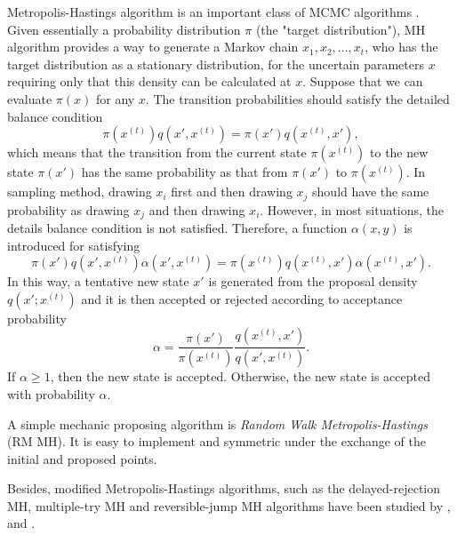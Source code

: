 Metropolis-Hastings algorithm is an important class of MCMC algorithms \cite{smith1993bayesian} \cite{tierney1994markov} \cite{gilks1995markov}. Given essentially a probability distribution $\pi$ (the "target distribution"), MH algorithm provides a way to generate a Markov chain $x_1, x_2,\ldots, x_t$, who has the target distribution as a stationary distribution, for the uncertain parameters $x$ requiring only that this density can be calculated at $x$. Suppose that we can evaluate $\pi(x)$ for any $x$. The transition probabilities should satisfy the detailed balance condition
\begin{equation*}
\pi(x^{(t)})q(x', x^{(t)}) = \pi(x')q(x^{(t)}, x'),
\end{equation*}
which means that the transition from the current state $\pi(x^{(t)})$ to the new state $\pi(x')$ has the same probability as that 
from $\pi(x')$ to $\pi(x^{(t)})$. In sampling method, drawing $x_i$ first and then drawing $x_j$ should have the same probability as drawing $x_j$ and then drawing $x_i$. However, in most situations, the details balance condition is not satisfied. Therefore, a function $\alpha(x,y)$ is introduced for satisfying 
\begin{equation*}
\pi(x')q(x', x^{(t)})\alpha(x',x^{(t)}) = \pi(x^{(t)})q(x^{(t)}, x')\alpha(x^{(t)},x').
\end{equation*}
In this way, a tentative new state $x'$ is generated from the proposal density $q(x';x^{(t)})$ and it is then accepted or rejected according to acceptance probability 
\begin{equation}\label{IntroAccp}
\alpha=\frac{\pi(x')}{\pi(x^{(t)})}\frac{q(x^{(t)}, x')}{q(x', x^{(t)})}.
\end{equation}
If $\alpha \geq 1$, then the new state is accepted. Otherwise, the new state is accepted with probability $\alpha$.

A simple mechanic proposing algorithm is \textit{Random Walk Metropolis-Hastings} (RM MH). It is easy to implement and symmetric under the exchange of the initial and proposed points. 

Besides, modified Metropolis-Hastings algorithms, such as the delayed-rejection MH, multiple-try MH and reversible-jump MH algorithms have been studied by \cite{tierney1999some}, \cite{liu2000multiple} and \cite{green1995reversible}. 
 

